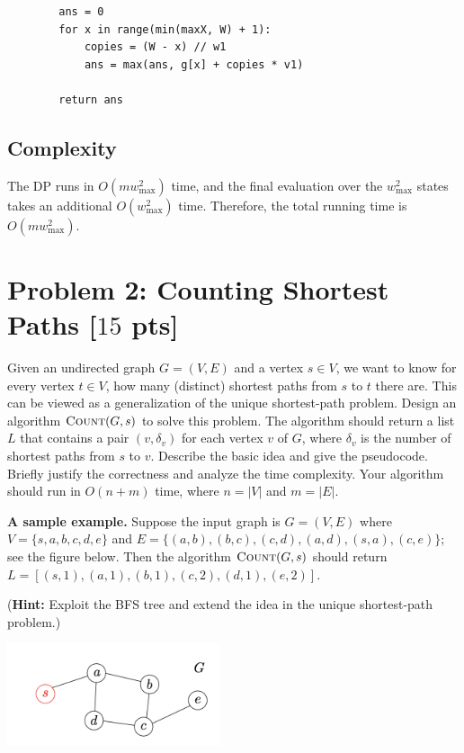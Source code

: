 \documentclass[letterpaper, 11pt]{article}
\newcommand{\1}{\mathds{1}}	%
\theoremstyle{definition}
\newcommand{\problem}[1]{\section*{Problem #1}}
\newenvironment{solution}{{\par\noindent\it Solution.}}{}
\begin{document}
\begin{solution}
\begin{lstlisting}
        ans = 0
        for x in range(min(maxX, W) + 1):
            copies = (W - x) // w1
            ans = max(ans, g[x] + copies * v1)
            
        return ans
    \end{lstlisting}
    
\subsection*{Complexity}

The DP runs in \(O(mw_{\max}^2)\) time, and the final evaluation over the \(w_{\max}^2\) states takes an additional \(O(w_{\max}^2)\) time. Therefore, the total running time is \(O(mw_{\max}^2)\).

\end{solution}

\clearpage

\problem{2: Counting Shortest Paths [$15$ pts]}
Given an undirected graph $G = (V,E)$ and a vertex $s \in V$, we want to know for every vertex $t \in V$, how many (distinct) shortest paths from $s$ to $t$ there are.
This can be viewed as a generalization of the unique shortest-path problem.
Design an algorithm $\textsc{Count}(G,s)$ to solve this problem.
The algorithm should return a list $L$ that contains a pair $(v,\delta_v)$ for each vertex $v$ of $G$, where $\delta_v$ is the number of shortest paths from $s$ to $v$.
Describe the basic idea and give the pseudocode.
Briefly justify the correctness and analyze the time complexity.
Your algorithm should run in $O(n+m)$ time, where $n = |V|$ and $m = |E|$.

\textbf{A sample example.}
Suppose the input graph is $G = (V,E)$ where $V = \{s,a,b,c,d,e\}$ and $E = \{(a,b),(b,c),(c,d),(a,d),(s,a),(c,e)\}$; see the figure below.
Then the algorithm $\textsc{Count}(G,s)$ should return $L = [(s,1),(a,1),(b,1),(c,2),(d,1),(e,2)]$.

(\textbf{Hint:} Exploit the BFS tree and extend the idea in the unique shortest-path problem.)

\begin{center}
    \includegraphics[height=3cm]{1.png}
\end{center}
\end{document}
